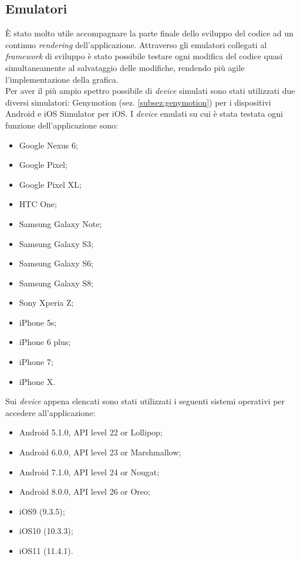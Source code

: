 \subsection{Emulatori}
È stato molto utile accompagnare la parte finale dello sviluppo del codice ad un continuo \emph{rendering} dell'applicazione. Attraverso gli emulatori collegati al \emph{framework} di sviluppo è stato possibile testare ogni modifica del codice quasi simultaneamente al salvataggio delle modifiche, rendendo più agile l'implementazione della grafica. \\
Per aver il più ampio spettro possibile di \emph{device} simulati sono stati utilizzati due diversi simulatori: Genymotion (sez. \ref{subsez:genymotion}) per i dispositivi Android e iOS Simulator per iOS.
I \emph{device} emulati su cui è stata testata ogni funzione dell'applicazione sono:
\begin{itemize}
	\item Google Nexus 6;
	\item Google Pixel;
	\item Google Pixel XL;
	\item HTC One;
	\item Samsung Galaxy Note;
	\item Samsung Galaxy S3;
	\item Samsung Galaxy S6;
	\item Samsung Galaxy S8;
	\item Sony Xperia Z;
	\item iPhone 5s;
	\item iPhone 6 plus;
	\item iPhone 7;
	\item iPhone X.
\end{itemize}
Sui \emph{device} appena elencati sono stati utilizzati i seguenti sistemi operativi per accedere all'applicazione:
\begin{itemize}
	\item Android 5.1.0, API level 22 or Lollipop;
	\item Android 6.0.0, API level 23 or Marshmallow;
	\item Android 7.1.0,  API level 24 or Nougat;
	\item Android 8.0.0,  API level 26 or Oreo;
	\item iOS9 (9.3.5);
	\item iOS10 (10.3.3);
	\item iOS11 (11.4.1).
\end{itemize}
